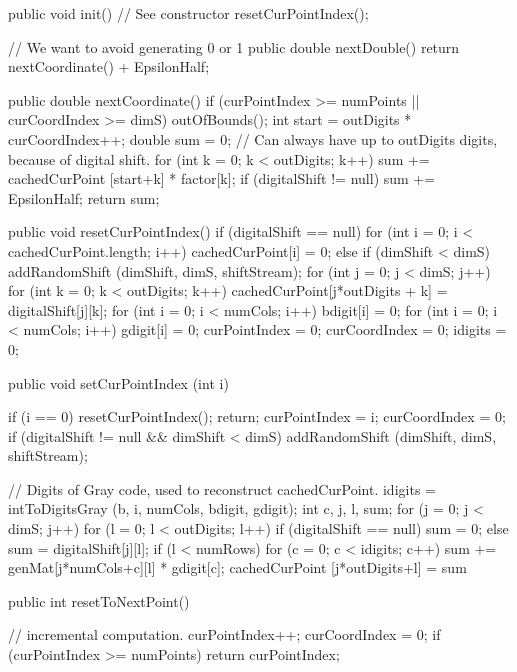 \begin{code}
\begin{hide}
{      public void init() { // See constructor
         resetCurPointIndex();
      }

      // We want to avoid generating 0 or 1
      public double nextDouble() {
         return nextCoordinate() + EpsilonHalf;
      }

      public double nextCoordinate() {
         if (curPointIndex >= numPoints || curCoordIndex >= dimS)
            outOfBounds();
         int start = outDigits * curCoordIndex++;
         double sum = 0;
         // Can always have up to outDigits digits, because of digital shift.
         for (int k = 0; k < outDigits; k++)
            sum += cachedCurPoint [start+k] * factor[k];
         if (digitalShift != null)
            sum += EpsilonHalf;
        return sum;
      }

      public void resetCurPointIndex() {
         if (digitalShift == null)
            for (int i = 0; i < cachedCurPoint.length; i++)
               cachedCurPoint[i] = 0;
         else {
            if (dimShift < dimS)
               addRandomShift (dimShift, dimS, shiftStream);
            for (int j = 0; j < dimS; j++)
               for (int k = 0; k < outDigits; k++)
                  cachedCurPoint[j*outDigits + k] = digitalShift[j][k];
         }
         for (int i = 0; i < numCols; i++) bdigit[i] = 0;
         for (int i = 0; i < numCols; i++) gdigit[i] = 0;
         curPointIndex = 0;
         curCoordIndex = 0;
         idigits = 0;
      }

      public void setCurPointIndex (int i) {
         if (i == 0) {
            resetCurPointIndex();
            return;
         }
         curPointIndex = i;
         curCoordIndex = 0;
         if (digitalShift != null && dimShift < dimS)
             addRandomShift (dimShift, dimS, shiftStream);

         // Digits of Gray code, used to reconstruct cachedCurPoint.
         idigits = intToDigitsGray (b, i, numCols, bdigit, gdigit);
         int c, j, l, sum;
         for (j = 0; j < dimS; j++) {
            for (l = 0; l < outDigits; l++) {
               if (digitalShift == null)
                  sum = 0;
               else
                  sum = digitalShift[j][l];
               if (l < numRows)
                  for (c = 0; c < idigits; c++)
                     sum += genMat[j*numCols+c][l] * gdigit[c];
               cachedCurPoint [j*outDigits+l] = sum %
            }
         }
      }

      public int resetToNextPoint() {
         // incremental computation.
         curPointIndex++;
         curCoordIndex = 0;
         if (curPointIndex >= numPoints)
            return curPointIndex;

}}
\end{hide}
\end{code}
